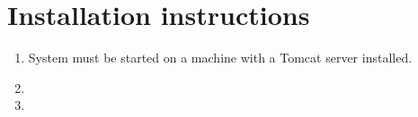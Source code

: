 \documentclass{article}
\begin{document}
\section{Installation instructions}
\begin{enumerate}
    \item System must be started on a machine with a Tomcat server installed.
    \item 
    
    \item
\end{enumerate}

\end{document}
